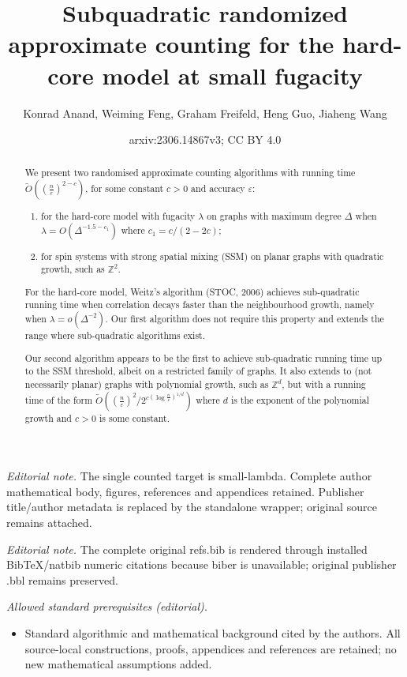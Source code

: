 \documentclass[10pt,a4paper]{article}
\title{Subquadratic randomized approximate counting for the hard-core model at small fugacity}
\author{Konrad Anand, Weiming Feng, Graham Freifeld, Heng Guo, Jiaheng Wang}
\date{arxiv:2306.14867v3; CC BY 4.0}
\newcommand{\eps}{\varepsilon}
\begin{document}
\maketitle
\noindent\textit{Editorial note.} The single counted target is small-lambda. Complete author mathematical body, figures, references and appendices retained. Publisher title/author metadata is replaced by the standalone wrapper; original source remains attached.\par\medskip
\noindent\textit{Editorial note.} The complete original refs.bib is rendered through installed BibTeX/natbib numeric citations because biber is unavailable; original publisher .bbl remains preserved.\par\medskip
\noindent\textit{Allowed standard prerequisites (editorial).}\begin{itemize}
\item Standard algorithmic and mathematical background cited by the authors. All source-local constructions, proofs, appendices and references are retained; no new mathematical assumptions added.
\end{itemize}\medskip

\begin{abstract}
  We present two randomised approximate counting algorithms with running time $\widetilde{O}\left(\left(\frac{n}{\eps}\right)^{2-c}\right)$, for some constant $c>0$ and accuracy $\eps$:
  \begin{enumerate}
    \item for the hard-core model with fugacity $\lambda$ on graphs with maximum degree $\Delta$ when $\lambda=O(\Delta^{-1.5-c_1})$ where $c_1=c/(2-2c)$;
    \item for spin systems with strong spatial mixing (SSM) on planar graphs with quadratic growth, such as $\mathbb{Z}^2$.
  \end{enumerate}

  For the hard-core model, Weitz's algorithm (STOC, 2006) achieves sub-quadratic running time when correlation decays faster than the neighbourhood growth, namely when $\lambda = o(\Delta^{-2})$.
  Our first algorithm does not require this property and extends the range where sub-quadratic algorithms exist.

  Our second algorithm appears to be the first to achieve sub-quadratic running time up to the SSM threshold, albeit on a restricted family of graphs.
  It also extends to (not necessarily planar) graphs with polynomial growth, such as $\mathbb{Z}^d$,
  but with a running time of the form $\widetilde{O}\left(\left(\frac{n}{\eps}\right)^{2}/2^{c(\log \frac{n}{\eps})^{1/d}}\right)$ where $d$ is the exponent of the polynomial growth and $c>0$ is some constant.
\end{abstract}
\end{document}
